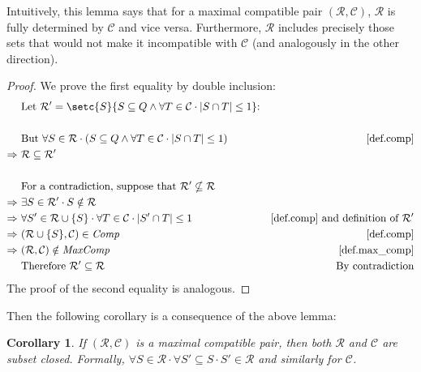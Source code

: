 \documentclass{report}
\DeclarePairedDelimiter{\set}{\{}{\}}
\DeclarePairedDelimiter{\abs}{\lvert}{\rvert}
\newtheorem{corollary}[theorem]{Corollary}
\theoremstyle{definition}
\begin{document}
Intuitively, this lemma says that for a maximal compatible pair
$(\mathcal{R}, \mathcal{C})$, $\mathcal{R}$ is fully determined by
$\mathcal{C}$ and vice versa. Furthermore, $\mathcal{R}$ includes precisely those
sets that would not make it incompatible with $\mathcal{C}$ (and analogously in the
other direction).

\begin{proof}
We prove the first equality by double inclusion:
\begin{align*}
& \text{Let } \mathcal{R}' = \setc{S}{S \subseteq Q \wedge
\forall T \in \mathcal{C} \cdot \abs{S \cap T} \leq 1} \text{:} \\
\\
& \text{But } \forall S \in \mathcal{R} \cdot (S \subseteq Q \wedge
\forall T \in \mathcal{C} \cdot \abs{S \cap T} \leq 1)
& \text{\cref{def.comp}} \\
\Rightarrow \ & \mathcal{R} \subseteq \mathcal{R}' \\
\\
& \text{For a contradiction, suppose that } \mathcal{R}' \nsubseteq \mathcal{R} \\
\Rightarrow \ & \exists S \in \mathcal{R}' \cdot S \notin \mathcal{R} \\
\Rightarrow \ & \forall S' \in \mathcal{R} \cup \set{S} \cdot
\forall T \in \mathcal{C} \cdot \abs{S' \cap T} \leq 1
& \text{\cref{def.comp} and definition of } \mathcal{R}' \\
\Rightarrow \ & (\mathcal{R} \cup \set{S}, \mathcal{C}) \in \mathit{Comp}
& \text{\cref{def.comp}} \\
\Rightarrow \ & (\mathcal{R}, \mathcal{C}) \notin \mathit{MaxComp}
& \text{\cref{def.max_comp}} \\
& \text{Therefore } \mathcal{R}' \subseteq \mathcal{R}
& \text{By contradiction}
\end{align*}
The proof of the second equality is analogous.
\end{proof}

Then the following corollary is a consequence of the above lemma:

\begin{corollary} \label{crl.max_comp_is_subset_closed}
If $(\mathcal{R}, \mathcal{C})$ is a maximal compatible pair, then both $\mathcal{R}$
and $\mathcal{C}$ are subset closed. Formally, $\forall S \in \mathcal{R} \cdot
\forall S' \subseteq S \cdot S' \in \mathcal{R}$ and similarly for $\mathcal{C}$.
\end{corollary}
\end{document}
